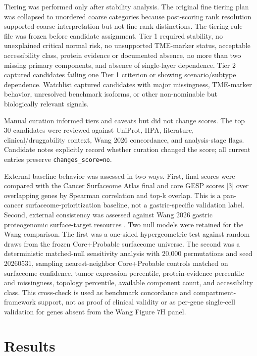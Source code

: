 \documentclass[twocolumn]{article}
\begin{document}
Tiering was performed only after stability analysis. The original fine tiering plan was collapsed to unordered coarse categories because post-scoring rank resolution supported coarse interpretation but not fine rank distinctions. The tiering rule file was frozen before candidate assignment. Tier 1 required stability, no unexplained critical normal risk, no unsupported TME-marker status, acceptable accessibility class, protein evidence or documented absence, no more than two missing primary components, and absence of single-layer dependence. Tier 2 captured candidates failing one Tier 1 criterion or showing scenario/\allowbreak{}subtype dependence. Watchlist captured candidates with major missingness, TME-marker behavior, unresolved benchmark isoforms, or other non-nominable but biologically relevant signals.

Manual curation informed tiers and caveats but did not change scores. The top 30 candidates were reviewed against UniProt, HPA, literature, clinical/\allowbreak{}druggability context, Wang 2026 concordance, and analysis-stage flags. Candidate notes explicitly record whether curation changed the score; all current entries preserve \texttt{changes\_score=no}.

External baseline behavior was assessed in two ways. First, final scores were compared with the Cancer Surfaceome Atlas final and core GESP scores [3] over overlapping genes by Spearman correlation and top-k overlap. This is a pan-cancer surfaceome-prioritization baseline, not a gastric-specific validation label. Second, external consistency was assessed against Wang 2026 gastric proteogenomic surface-target resources \cite{wang2026gastric}. Two null models were retained for the Wang comparison. The first was a one-sided hypergeometric test against random draws from the frozen Core+\allowbreak{}Probable surfaceome universe. The second was a deterministic matched-null sensitivity analysis with 20,000 permutations and seed 20260531, sampling nearest-neighbor Core+\allowbreak{}Probable controls matched on surfaceome confidence, tumor expression percentile, protein-evidence percentile and missingness, topology percentile, available component count, and accessibility class. This cross-check is used as benchmark concordance and compartment-framework support, not as proof of clinical validity or as per-gene single-cell validation for genes absent from the Wang Figure 7H panel.

\section{Results}
\end{document}
